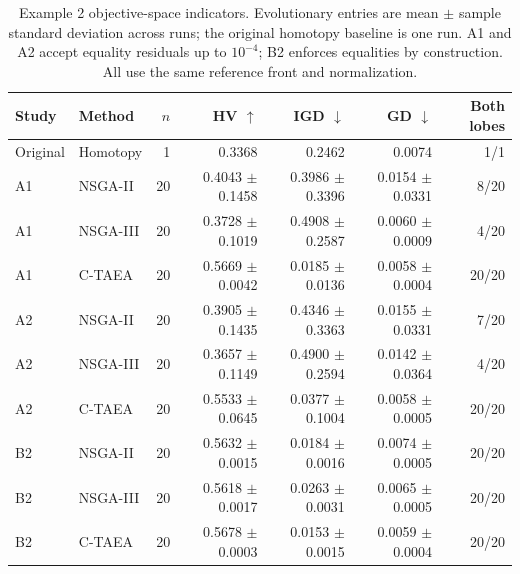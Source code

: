 \begin{table}[htbp]
\centering
\small
\caption{Example 2 objective-space indicators. Evolutionary entries are mean $\pm$ sample standard deviation across runs; the original homotopy baseline is one run. A1 and A2 accept equality residuals up to $10^{-4}$; B2 enforces equalities by construction. All use the same reference front and normalization.}
\label{tab:example2_overall}
\begin{tabular}{llrrrrr}
\hline
Study & Method & $n$ & HV $\uparrow$ & IGD $\downarrow$ & GD $\downarrow$ & Both lobes \\
\hline
Original & Homotopy & 1 & 0.3368 & 0.2462 & 0.0074 & 1/1 \\
A1 & NSGA-II & 20 & 0.4043 $\pm$ 0.1458 & 0.3986 $\pm$ 0.3396 & 0.0154 $\pm$ 0.0331 & 8/20 \\
A1 & NSGA-III & 20 & 0.3728 $\pm$ 0.1019 & 0.4908 $\pm$ 0.2587 & 0.0060 $\pm$ 0.0009 & 4/20 \\
A1 & C-TAEA & 20 & 0.5669 $\pm$ 0.0042 & 0.0185 $\pm$ 0.0136 & 0.0058 $\pm$ 0.0004 & 20/20 \\
A2 & NSGA-II & 20 & 0.3905 $\pm$ 0.1435 & 0.4346 $\pm$ 0.3363 & 0.0155 $\pm$ 0.0331 & 7/20 \\
A2 & NSGA-III & 20 & 0.3657 $\pm$ 0.1149 & 0.4900 $\pm$ 0.2594 & 0.0142 $\pm$ 0.0364 & 4/20 \\
A2 & C-TAEA & 20 & 0.5533 $\pm$ 0.0645 & 0.0377 $\pm$ 0.1004 & 0.0058 $\pm$ 0.0005 & 20/20 \\
B2 & NSGA-II & 20 & 0.5632 $\pm$ 0.0015 & 0.0184 $\pm$ 0.0016 & 0.0074 $\pm$ 0.0005 & 20/20 \\
B2 & NSGA-III & 20 & 0.5618 $\pm$ 0.0017 & 0.0263 $\pm$ 0.0031 & 0.0065 $\pm$ 0.0005 & 20/20 \\
B2 & C-TAEA & 20 & 0.5678 $\pm$ 0.0003 & 0.0153 $\pm$ 0.0015 & 0.0059 $\pm$ 0.0004 & 20/20 \\
\hline
\end{tabular}
\end{table}
